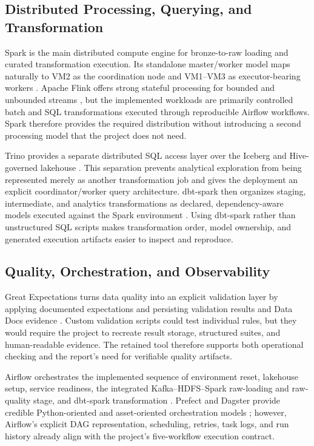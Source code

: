 \subsection{Distributed Processing, Querying, and Transformation}
Spark is the main distributed compute engine for bronze-to-raw loading and curated transformation execution. Its standalone master/worker model maps naturally to VM2 as the coordination node and VM1--VM3 as executor-bearing workers \cite{apache_spark_docs}. Apache Flink offers strong stateful processing for bounded and unbounded streams \cite{apache_flink_docs}, but the implemented workloads are primarily controlled batch and SQL transformations executed through reproducible Airflow workflows. Spark therefore provides the required distribution without introducing a second processing model that the project does not need.

Trino provides a separate distributed SQL access layer over the Iceberg and Hive-governed lakehouse \cite{trino_docs}. This separation prevents analytical exploration from being represented merely as another transformation job and gives the deployment an explicit coordinator/worker query architecture. dbt-spark then organizes staging, intermediate, and analytics transformations as declared, dependency-aware models executed against the Spark environment \cite{dbt_docs}. Using dbt-spark rather than unstructured SQL scripts makes transformation order, model ownership, and generated execution artifacts easier to inspect and reproduce.

\subsection{Quality, Orchestration, and Observability}
Great Expectations turns data quality into an explicit validation layer by applying documented expectations and persisting validation results and Data Docs evidence \cite{great_expectations_docs}. Custom validation scripts could test individual rules, but they would require the project to recreate result storage, structured suites, and human-readable evidence. The retained tool therefore supports both operational checking and the report's need for verifiable quality artifacts.

Airflow orchestrates the implemented sequence of environment reset, lakehouse setup, service readiness, the integrated Kafka--HDFS--Spark raw-loading and raw-quality stage, and dbt-spark transformation \cite{apache_airflow_docs}. Prefect and Dagster provide credible Python-oriented and asset-oriented orchestration models \cite{prefect_docs,dagster_docs}; however, Airflow's explicit DAG representation, scheduling, retries, task logs, and run history already align with the project's five-workflow execution contract.

